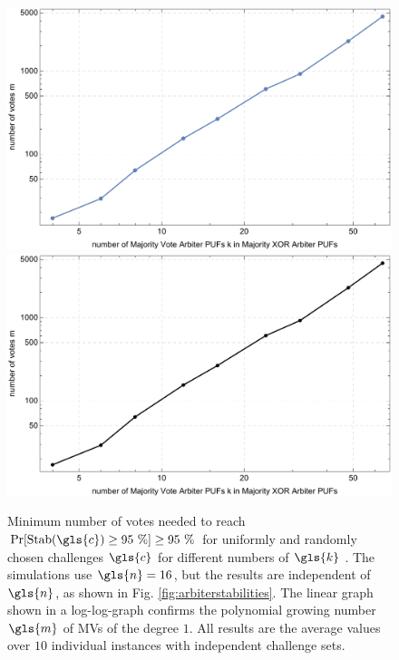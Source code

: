 \begin{figure}[ht]
\ifx{}\undefined
{}
\else
	\if{}
\centering
\includegraphics[width=1.00\textwidth]{images/votes-stab-simulation.pdf}
	\else
\includegraphics[width=1.00\textwidth]{images/votes-stab-simulation_mono.pdf} 
    \fi
\fi
\caption[Number of votes needed for large Majority \acs{XOR} \apufs]{Minimum number of votes needed to reach $\Pr[\protect\Stab(\gls{c}) \ge 95\ \%] \ge 95\ \%$ for uniformly and randomly chosen challenges $\gls{c}$ for different numbers of $\gls{k}$ \apufs. 
The simulations use $\gls{n} = 16$, but the results are independent of $\gls{n}$, as shown in Fig. \ref{fig:arbiterstabilities}. 
The linear graph shown in a log-log-graph confirms the polynomial growing number $\gls{m}$ of \acp{MV} of the degree $1$.
All results are the average values over $10$ individual \puf instances with independent challenge sets.} 
\label{fig:majorityvotegrowth}
\end{figure}
\pagebreak

